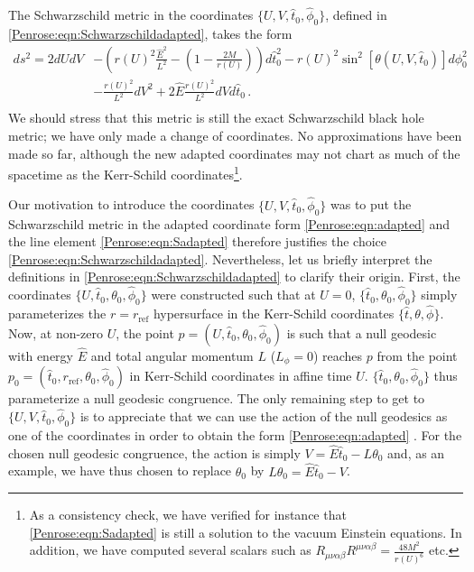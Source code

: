 The Schwarzschild metric in the coordinates $\lbrace U,V,\hat{t}_0,\hat{\phi}_0 \rbrace$, defined in \eqref{Penrose:eqn:Schwarzschildadapted}, takes the form
\begin{equation}\label{Penrose:eqn:Sadapted}
\begin{aligned}
ds^2 =  
2 dU dV&- \left(r(U)^2 \frac{\hat{E}^2}{L^2}-\left(1-\frac{2M}{r(U)}\right)\right)d\hat{t}_0^2 - r(U)^2 \sin^2\left\lbrack\theta(U,V,\hat{t}_0)\right\rbrack d \phi_0^2  \\ &-\frac{r(U)^2}{L^2} dV^2+2\hat{E} \frac{r(U)^2}{L^2} dV d\hat{t}_0 \, .\\
\end{aligned}
\end{equation}
We should stress that this metric is still the exact Schwarzschild black hole metric; we have only made a change of coordinates. No approximations have been made so far, although the new adapted coordinates may not chart as much of the spacetime as the Kerr-Schild coordinates\footnote{As a consistency check, we have verified for instance that \eqref{Penrose:eqn:Sadapted} is still a solution to the vacuum Einstein equations. In addition, we have computed several scalars such as $R_{\mu \nu \alpha \beta}R^{\mu \nu \alpha \beta} = \frac{48 M^2}{r(U)^6}$ etc.}.

Our motivation to introduce the coordinates $\lbrace U,V,\hat{t}_0,\hat{\phi}_0\rbrace$ was to put the
Schwarzschild metric in the adapted coordinate form \eqref{Penrose:eqn:adapted} and the line element
\eqref{Penrose:eqn:Sadapted} therefore justifies the choice \eqref{Penrose:eqn:Schwarzschildadapted}. Nevertheless,
let us briefly interpret the definitions in \eqref{Penrose:eqn:Schwarzschildadapted} to clarify their origin.
First, the coordinates $\lbrace U,\hat{t}_0,\theta_0,\hat{\phi}_0 \rbrace$ were constructed such that at $U = 0$,
$\lbrace\hat{t}_0,\theta_0,\hat{\phi}_0\rbrace$ simply parameterizes the $r = r_{\mathrm{ref}}$ hypersurface in the
Kerr-Schild coordinates $\lbrace\hat{t},\theta,\hat{\phi} \rbrace$. Now, at non-zero $U$, the point $p =(
U,\hat{t}_0,\theta_0,\hat{\phi}_0)$ is such that a null geodesic with energy $\hat{E}$ and total angular momentum
$L$ ($L_{\phi} = 0$) reaches $p$ from the point $p_0 = ( \hat{t}_0 , r_{\mathrm{ref}},\theta_0,\hat{\phi}_0 )$ in Kerr-Schild coordinates in affine time $U$. $\lbrace\hat{t}_0,\theta_0,\hat{\phi}_0 \rbrace$ thus parameterize a null geodesic congruence. The only remaining step to get to $\lbrace U,V,\hat{t}_0,\hat{\phi}_0 \rbrace$ is to appreciate that we can use the action of the null geodesics as one of the coordinates in order to obtain the form \eqref{Penrose:eqn:adapted} \cite{Patricot:2003dh, blau2011plane}. For the chosen null geodesic congruence, the action is simply $V = \hat{E}\hat{t}_0 - L \theta_0$ and, as an example, we have thus chosen to replace $\theta_0$ by $L \theta_0= \hat{E}\hat{t}_0  - V$.  

